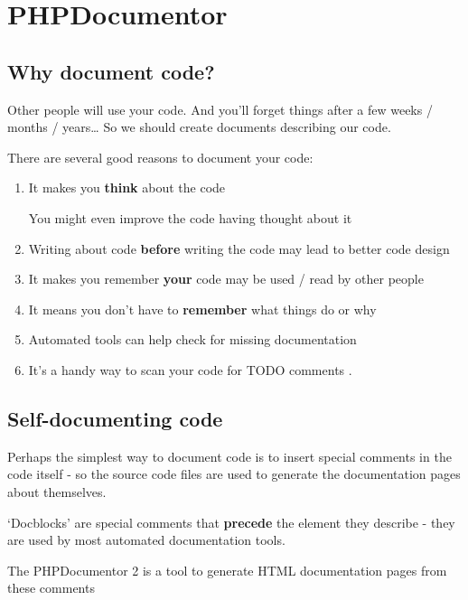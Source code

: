 \documentclass[a4paperpaper,openright]{book}
\begin{document}
\hypertarget{phpdocumentor}{%
\chapter{PHPDocumentor}\label{phpdocumentor}}

\hypertarget{why-document-code}{%
\section{Why document code?}\label{why-document-code}}

Other people will use your code. And you'll forget things after a few
weeks / months / years\ldots{} So we should create documents describing
our code.

There are several good reasons to document your code:

\begin{enumerate}
\def\labelenumi{\arabic{enumi}.}
\item
  It makes you \textbf{think} about the code

  You might even improve the code having thought about it
\item
  Writing about code \textbf{before} writing the code may lead to better
  code design
\item
  It makes you remember \textbf{your} code may be used / read by other
  people
\item
  It means you don't have to \textbf{remember} what things do or why
\item
  Automated tools can help check for missing documentation
\item
  It's a handy way to scan your code for TODO comments .
\end{enumerate}

\hypertarget{self-documenting-code}{%
\section{Self-documenting code}\label{self-documenting-code}}

Perhaps the simplest way to document code is to insert special comments
in the code itself - so the source code files are used to generate the
documentation pages about themselves.

`Docblocks' are special comments that \textbf{precede} the element they
describe - they are used by most automated documentation tools.

The PHPDocumentor 2 is a tool to generate HTML documentation pages from
these comments
\end{document}
